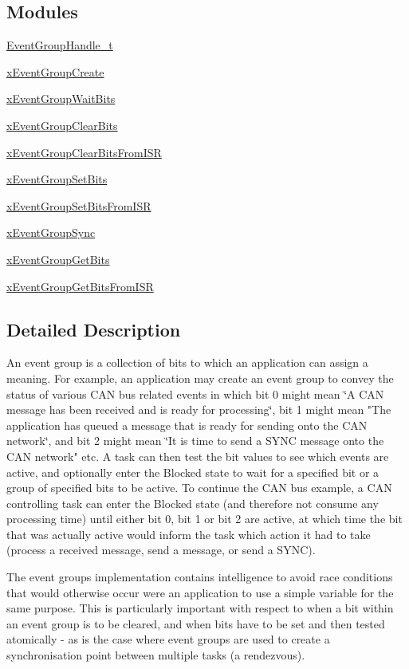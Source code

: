 \subsection*{Modules}
\begin{DoxyCompactItemize}
\item 
\hyperlink{group__EventGroupHandle__t}{Event\+Group\+Handle\+\_\+t}
\item 
\hyperlink{group__xEventGroupCreate}{x\+Event\+Group\+Create}
\item 
\hyperlink{group__xEventGroupWaitBits}{x\+Event\+Group\+Wait\+Bits}
\item 
\hyperlink{group__xEventGroupClearBits}{x\+Event\+Group\+Clear\+Bits}
\item 
\hyperlink{group__xEventGroupClearBitsFromISR}{x\+Event\+Group\+Clear\+Bits\+From\+I\+SR}
\item 
\hyperlink{group__xEventGroupSetBits}{x\+Event\+Group\+Set\+Bits}
\item 
\hyperlink{group__xEventGroupSetBitsFromISR}{x\+Event\+Group\+Set\+Bits\+From\+I\+SR}
\item 
\hyperlink{group__xEventGroupSync}{x\+Event\+Group\+Sync}
\item 
\hyperlink{group__xEventGroupGetBits}{x\+Event\+Group\+Get\+Bits}
\item 
\hyperlink{group__xEventGroupGetBitsFromISR}{x\+Event\+Group\+Get\+Bits\+From\+I\+SR}
\end{DoxyCompactItemize}


\subsection{Detailed Description}
An event group is a collection of bits to which an application can assign a meaning. For example, an application may create an event group to convey the status of various C\+AN bus related events in which bit 0 might mean \char`\"{}\+A C\+A\+N
message has been received and is ready for processing\char`\"{}, bit 1 might mean "The application has queued a message that is ready for sending onto the C\+AN network\char`\"{}, and bit 2 might mean \char`\"{}It is time to send a S\+Y\+NC message onto the C\+AN network" etc. A task can then test the bit values to see which events are active, and optionally enter the Blocked state to wait for a specified bit or a group of specified bits to be active. To continue the C\+AN bus example, a C\+AN controlling task can enter the Blocked state (and therefore not consume any processing time) until either bit 0, bit 1 or bit 2 are active, at which time the bit that was actually active would inform the task which action it had to take (process a received message, send a message, or send a S\+Y\+NC).

The event groups implementation contains intelligence to avoid race conditions that would otherwise occur were an application to use a simple variable for the same purpose. This is particularly important with respect to when a bit within an event group is to be cleared, and when bits have to be set and then tested atomically -\/ as is the case where event groups are used to create a synchronisation point between multiple tasks (a \textquotesingle{}rendezvous\textquotesingle{}). 